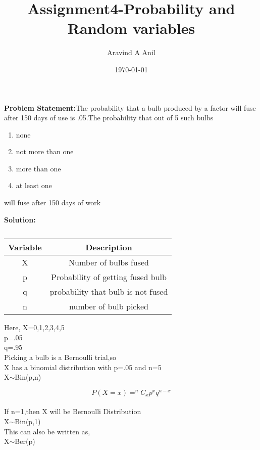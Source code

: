 \documentclass[11pt,a4paper,twocolumn]{article}
\title{\textbf{Assignment4-Probability and Random variables}}
\author{Aravind A Anil}
\date{\today}
\begin{document}
\maketitle
\begin{flushleft}
\textbf{Problem Statement:}The probability that a bulb produced by a factor will fuse after 150 days of use is .05.The probability that out of 5 such bulbs
\begin{flushleft}
\begin{enumerate}[i]
    \item none
    \item not more than one
    \item more than one
    \item at least one
\end{enumerate}
will fuse after 150 days of work
\end{flushleft}

\textbf{Solution:}
\begin{table}[h]
    \centering
    \begin{tabular}{|c|c|}
    \hline
         Variable&Description  \\
         \hline
         X&Number of bulbs fused\\
         \hline
         p&Probability of getting fused bulb\\
         \hline
         q&probability that bulb is not fused\\
         \hline
         n&number of bulb picked\\
         \hline
    \end{tabular}
    \caption{}
    \label{tab:my_label}
\end{table}
\begin{flushleft}
Here, X=0,1,2,3,4,5
\\p=.05
\\q=.95
\\Picking a bulb is a Bernoulli trial,so
\\X has a binomial distribution with p=.05 and n=5
\\X$\sim$Bin(p,n)
\end{flushleft}
\begin{equation}
P(X=x)=^{n}C_xp^{x}q^{n-x}
\end{equation}
\\If n=1,then X will be Bernoulli Distribution
\\X$\sim$Bin(p,1)
\\This can also be written as,
\\X$\sim$Ber(p)
\end{flushleft}
\end{document}
